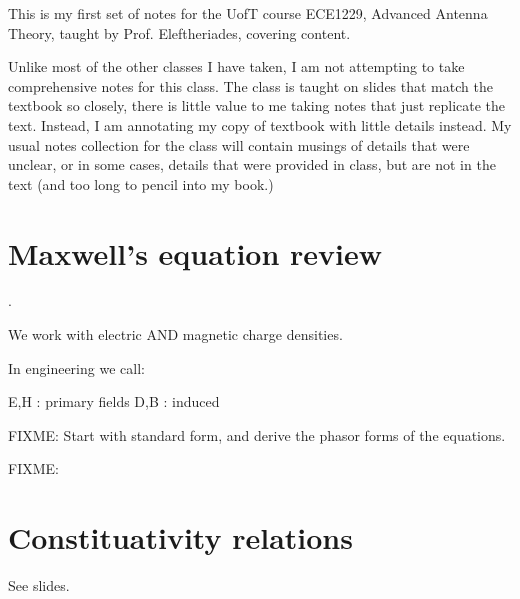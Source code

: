 %
%

\renewcommand{\basename}{chapter3Notes}
\renewcommand{\dirname}{notes/ece1229/}



\usepackage{ece1229}

\beginArtNoToc


This is my first set of notes for the UofT course ECE1229, Advanced Antenna Theory, taught by Prof. Eleftheriades, covering  \citep{balanis2005antenna} content.

Unlike most of the other classes I have taken, I am not attempting to take comprehensive notes for this class.  The class is taught on slides that match the textbook so closely, there is little value to me taking notes that just replicate the text.  Instead, I am annotating my copy of textbook with little details instead.  My usual notes collection for the class will contain musings of details that were unclear, or in some cases, details that were provided in class, but are not in the text (and too long to pencil into my book.)

\section{Maxwell's equation review}.

We work with electric AND magnetic charge densities.

In engineering we call:

E,H : primary fields
D,B : induced

FIXME: Start with standard form, and derive the phasor forms of the equations.


FIXME: 
\section{Constituativity relations}

See slides.

